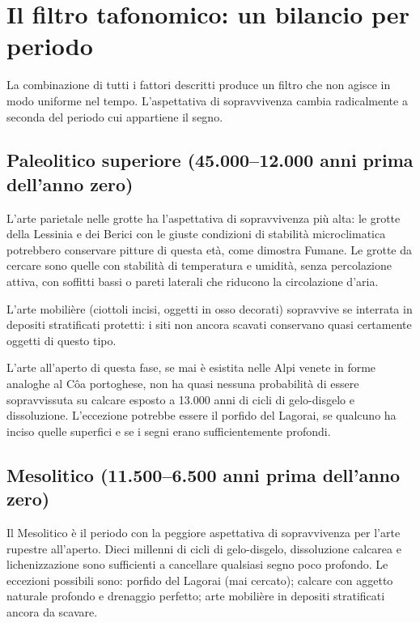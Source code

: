 \section{Il filtro tafonomico: un bilancio per periodo}

La combinazione di tutti i fattori descritti produce un filtro che non agisce in modo uniforme nel tempo. L'aspettativa di sopravvivenza cambia radicalmente a seconda del periodo cui appartiene il segno.

\subsection{Paleolitico superiore (45.000--12.000 anni prima dell'anno zero)}

L'arte parietale nelle grotte ha l'aspettativa di sopravvivenza più alta: le grotte della Lessinia e dei Berici con le giuste condizioni di stabilità microclimatica potrebbero conservare pitture di questa età, come dimostra Fumane. Le grotte da cercare sono quelle con stabilità di temperatura e umidità, senza percolazione attiva, con soffitti bassi o pareti laterali che riducono la circolazione d'aria.

L'arte mobilière (ciottoli incisi, oggetti in osso decorati) sopravvive se interrata in depositi stratificati protetti: i siti non ancora scavati conservano quasi certamente oggetti di questo tipo.

L'arte all'aperto di questa fase, se mai è esistita nelle Alpi venete in forme analoghe al Côa portoghese, non ha quasi nessuna probabilità di essere sopravvissuta su calcare esposto a 13.000 anni di cicli di gelo-disgelo e dissoluzione. L'eccezione potrebbe essere il porfido del Lagorai, se qualcuno ha inciso quelle superfici e se i segni erano sufficientemente profondi.

\subsection{Mesolitico (11.500--6.500 anni prima dell'anno zero)}

Il Mesolitico è il periodo con la peggiore aspettativa di sopravvivenza per l'arte rupestre all'aperto. Dieci millenni di cicli di gelo-disgelo, dissoluzione calcarea e lichenizzazione sono sufficienti a cancellare qualsiasi segno poco profondo. Le eccezioni possibili sono: porfido del Lagorai (mai cercato); calcare con aggetto naturale profondo e drenaggio perfetto; arte mobilière in depositi stratificati ancora da scavare.

